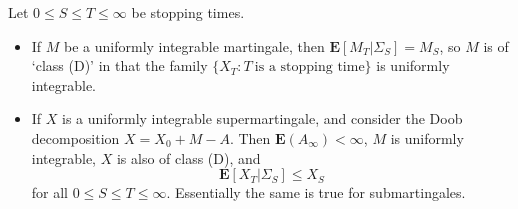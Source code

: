 \begin{theorem}
    Let $0 \leq S \leq T \leq \infty$ be stopping times.
    \begin{itemize}
        \item If $M$ be a uniformly integrable martingale, then $\mathbf{E}[M_T|\Sigma_S] = M_S$, so $M$ is of `class (D)' in that the family $\{ X_T: T\ \text{is a stopping time} \}$ is uniformly integrable.

        \item If $X$ is a uniformly integrable supermartingale, and consider the Doob decomposition $X = X_0 + M - A$. Then $\mathbf{E}(A_\infty) < \infty$, $M$ is uniformly integrable, $X$ is also of class (D), and
        \[ \mathbf{E}[X_T|\Sigma_S] \leq X_S \]
        for all $0 \leq S \leq T \leq \infty$. Essentially the same is true for submartingales.
    \end{itemize}
\end{theorem}
